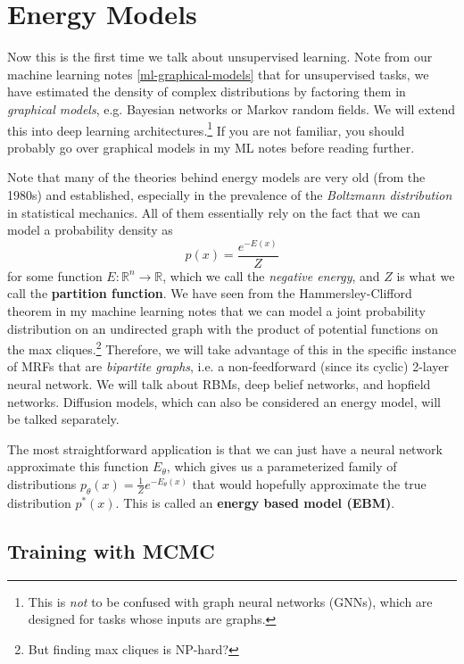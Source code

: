 \section{Energy Models} 

  Now this is the first time we talk about unsupervised learning. Note from our machine learning notes \ref{ml-graphical-models} that for unsupervised tasks, we have estimated the density of complex distributions by factoring them in \textit{graphical models}, e.g. Bayesian networks or Markov random fields. 
  We will extend this into deep learning architectures.\footnote{This is \textit{not} to be confused with graph neural networks (GNNs), which are designed for tasks whose inputs are graphs.} If you are not familiar, you should probably go over graphical models in my ML notes before reading further. 

  Note that many of the theories behind energy models are very old (from the 1980s) and established, especially in the prevalence of the \textit{Boltzmann distribution} in statistical mechanics. All of them essentially rely on the fact that we can model a probability density as 
  \begin{equation}
    p(x) = \frac{e^{-E(x)}}{Z}
  \end{equation}
  for some function $E: \mathbb{R}^n \rightarrow \mathbb{R}$, which we call the \textit{negative energy}, and $Z$ is what we call the \textbf{partition function}. We have seen from the Hammersley-Clifford theorem in my machine learning notes that we can model a joint probability distribution on an undirected graph with the product of potential functions on the max cliques.\footnote{But finding max cliques is NP-hard?} Therefore, we will take advantage of this in the specific instance of MRFs that are \textit{bipartite graphs}, i.e. a non-feedforward (since its cyclic) 2-layer neural network. We will talk about RBMs, deep belief networks, and hopfield networks. Diffusion models, which can also be considered an energy model, will be talked separately. 

  The most straightforward application is that we can just have a neural network approximate this function $E_\theta$, which gives us a parameterized family of distributions $p_\theta (x) = \frac{1}{Z} e^{-E_\theta (x)}$ that would hopefully approximate the true distribution $p^\ast (x)$. This is called an \textbf{energy based model (EBM)}. 

\subsection{Training with MCMC}

